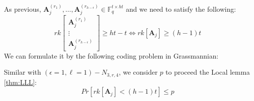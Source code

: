 As previous, $\boldsymbol{A}_{j}^{\left(r_{1}\right)},\ldots,\boldsymbol{A}_{j}^{\left(r_{h-\epsilon}\right)}\in\ensuremath{\mathbb{F}}_{q}^{t\times ht}$
and we need to satisfy the following:
\[
rk\left[\begin{array}{c}
\boldsymbol{A}_{j}^{\left(r_{1}\right)}\\
\vdots\\
\boldsymbol{A}_{j}^{\left(r_{h-\epsilon}\right)}
\end{array}\right]\geq ht-t\Leftrightarrow rk\left[\boldsymbol{A}_{j}\right]\geq(h-1)t
\]
We can formulate it by the following coding problem in Grassmannian:

\noindent{}Similar with $\left(\epsilon=1,\ell=1\right)-\ensuremath{N}_{3,r,4}$,
we consider $p$ to proceed the Local lemma \ref{thm:LLL}:
\begin{equation}
Pr\left[rk\left[\boldsymbol{A}_{j}\right]<(h-1)t\right]\leq p\label{eq:p_e1l1}
\end{equation}

